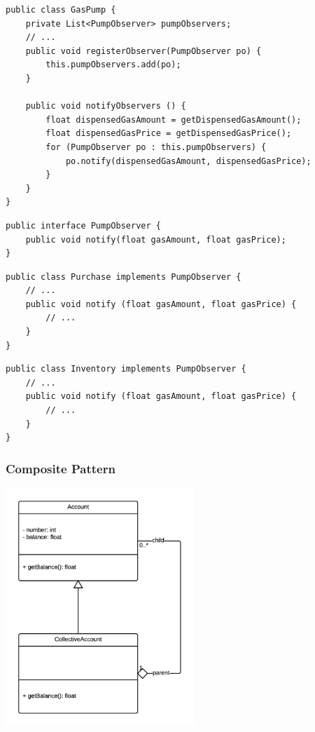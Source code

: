 \documentclass[11pt, a4paper]{article}
\newcommand{\setcodelisting}{\lstset{ basicstyle=\footnotesize\ttfamily }}
\begin{document}
\bigskip
\setcodelisting
\begin{lstlisting}
public class GasPump {
	private List<PumpObserver> pumpObservers;
	// ...
	public void registerObserver(PumpObserver po) {
		this.pumpObservers.add(po);
	}
	
	public void notifyObservers () {
		float dispensedGasAmount = getDispensedGasAmount();
		float dispensedGasPrice = getDispensedGasPrice();
		for (PumpObserver po : this.pumpObservers) {
			po.notify(dispensedGasAmount, dispensedGasPrice);
		}
	}
}
\end{lstlisting}


\begin{lstlisting}
public interface PumpObserver {
	public void notify(float gasAmount, float gasPrice);
}
\end{lstlisting}


\begin{lstlisting}
public class Purchase implements PumpObserver {
	// ...
	public void notify (float gasAmount, float gasPrice) {
		// ...
	}
}
\end{lstlisting}


\begin{lstlisting}
public class Inventory implements PumpObserver {
	// ...
	public void notify (float gasAmount, float gasPrice) {
		// ...
	}
}
\end{lstlisting}




\subsubsection{Composite Pattern}

\centerline{\includegraphics[height=9cm]{CompositePattern.png}}
\end{document}
